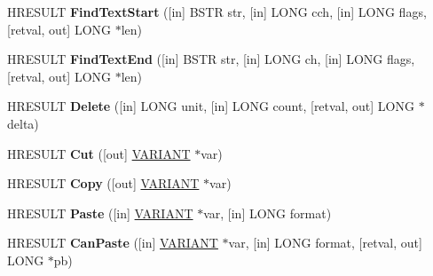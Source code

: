 \begin{DoxyCompactItemize}
\item 
\mbox{\label{interfacetom_1_1_i_text_range_a28eb62e9c662f8d8ff1084c8bc837cc5}} 
H\+R\+E\+S\+U\+LT {\bfseries Find\+Text\+Start} (\mbox{[}in\mbox{]} B\+S\+TR str, \mbox{[}in\mbox{]} L\+O\+NG cch, \mbox{[}in\mbox{]} L\+O\+NG flags, \mbox{[}retval, out\mbox{]} L\+O\+NG $\ast$len)
\item 
\mbox{\label{interfacetom_1_1_i_text_range_a9419ed504064db6b542c1bd9ab24fbd9}} 
H\+R\+E\+S\+U\+LT {\bfseries Find\+Text\+End} (\mbox{[}in\mbox{]} B\+S\+TR str, \mbox{[}in\mbox{]} L\+O\+NG ch, \mbox{[}in\mbox{]} L\+O\+NG flags, \mbox{[}retval, out\mbox{]} L\+O\+NG $\ast$len)
\item 
\mbox{\label{interfacetom_1_1_i_text_range_ab59477db81d7829818b311e45c1b1364}} 
H\+R\+E\+S\+U\+LT {\bfseries Delete} (\mbox{[}in\mbox{]} L\+O\+NG unit, \mbox{[}in\mbox{]} L\+O\+NG count, \mbox{[}retval, out\mbox{]} L\+O\+NG $\ast$delta)
\item 
\mbox{\label{interfacetom_1_1_i_text_range_afd5ce6c66c2040033354856534814a11}} 
H\+R\+E\+S\+U\+LT {\bfseries Cut} (\mbox{[}out\mbox{]} \hyperlink{structtag_v_a_r_i_a_n_t}{V\+A\+R\+I\+A\+NT} $\ast$var)
\item 
\mbox{\label{interfacetom_1_1_i_text_range_a3330697337ad324b627328c72a79c057}} 
H\+R\+E\+S\+U\+LT {\bfseries Copy} (\mbox{[}out\mbox{]} \hyperlink{structtag_v_a_r_i_a_n_t}{V\+A\+R\+I\+A\+NT} $\ast$var)
\item 
\mbox{\label{interfacetom_1_1_i_text_range_aeff9f75d09a351863a8c6ac9b612aeb9}} 
H\+R\+E\+S\+U\+LT {\bfseries Paste} (\mbox{[}in\mbox{]} \hyperlink{structtag_v_a_r_i_a_n_t}{V\+A\+R\+I\+A\+NT} $\ast$var, \mbox{[}in\mbox{]} L\+O\+NG format)
\item 
\mbox{\label{interfacetom_1_1_i_text_range_a1ac8650c83c5447d4e544d594dc322fa}} 
H\+R\+E\+S\+U\+LT {\bfseries Can\+Paste} (\mbox{[}in\mbox{]} \hyperlink{structtag_v_a_r_i_a_n_t}{V\+A\+R\+I\+A\+NT} $\ast$var, \mbox{[}in\mbox{]} L\+O\+NG format, \mbox{[}retval, out\mbox{]} L\+O\+NG $\ast$pb)
\item 

\end{DoxyCompactItemize}
